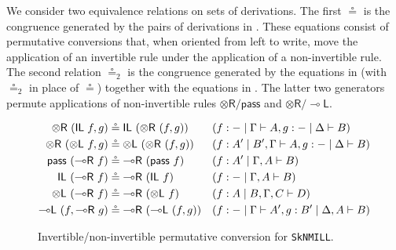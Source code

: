 \documentclass[runningheads]{llncs}
\newcommand{\tl}{\otimes \mathsf{L}}
\newcommand{\tr}{\otimes \mathsf{R}}
\newcommand{\lright}{{\multimap}\mathsf{R}}
\newcommand{\lleft}{{\multimap}\mathsf{L}}
\newcommand{\pass}{\mathsf{pass}}
\newcommand{\unitl}{\mathsf{IL}}
\newcommand{\unitr}{\mathsf{IR}}
\newcommand{\otR}{\tr}
\newcommand{\lolliR}{\lright}
\newcommand{\lolliL}{\lleft}
\newcommand{\ax}{\mathsf{ax}}
\newcommand{\ot}{\otimes}
\newcommand{\lolli}{\multimap}
\newcommand{\I}{\mathsf{I}}
\newcommand{\SkNMILL}{\texttt{SkNMILL}}
\begin{document}
We consider two equivalence relations on sets of derivations. The first $\circeq$ is the congruence generated by the pairs of derivations in . These equations consist of permutative conversions that, when oriented from left to write, move the application of an invertible rule under the application of a non-invertible rule. The second relation $\circeq_2$ is the congruence generated by the equations in  (with $\circeq_2$ in place of $\circeq$) together with the equations in . The latter two generators permute applications of non-invertible rules $\otR/\pass$ and $\otR/\lolliL$.
\begin{figure}[t]
\begin{align*}\small
  \tr \text{ } (\unitl \text{ } f, g) &\circeq \unitl \text{ } (\tr \text{ } (f , g)) &&(f : - \mid \Gamma \vdash A , g : - \mid \Delta \vdash B)
  \\
  \tr \text{ } (\tl \text{ } f, g) &\circeq \tl \text{ } (\tr \text{ } (f , g)) &&(f : A' \mid B' , \Gamma \vdash A , g : - \mid \Delta \vdash B)
  \\
  \pass \text{ } (\lolliR \text{ } f) &\circeq \lolliR \text{ } (\pass \text{ } f) &&(f : A' \mid \Gamma , A \vdash B)
  \\
  \unitl \text{ } (\lolliR \text{ } f) &\circeq \lolliR \text{ } (\unitl \text{ } f) &&(f : - \mid \Gamma , A \vdash B)
  \\
  \tl \text{ } (\lolliR \text{ } f) &\circeq \lolliR \text{ } (\tl \text{ } f) &&(f : A \mid B , \Gamma , C \vdash D)
  \\
  \lleft \text{ } (f, \lolliR \text{ } g) &\circeq \lolliR \text{ } (\lleft \text{ } (f, g)) &&(f : - \mid \Gamma \vdash A', g : B' \mid \Delta , A \vdash B)
\end{align*}
\caption{Invertible/non-invertible permutative conversion for \SkNMILL.}
\label{fig:circeq}
\end{figure}
\end{document}
